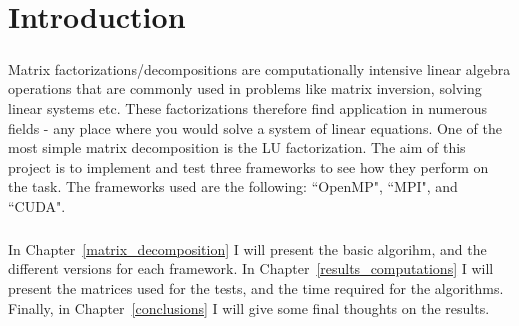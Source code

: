 \chapter{Introduction}
\paragraph{}
Matrix factorizations/decompositions are computationally intensive linear algebra operations that are commonly used in problems like matrix inversion, solving linear systems etc. These factorizations therefore find application in numerous fields - any place where you would solve a system of linear equations. One of the most simple matrix decomposition is the LU factorization. The aim of this project is to implement and test three frameworks to see how they perform on the task. The frameworks used are the following: ``OpenMP", ``MPI", and ``CUDA".

\paragraph{}
In Chapter~\ref{matrix_decomposition} I will present the basic algorihm, and the different versions for each framework. In Chapter~\ref{results_computations} I will present the matrices used for the tests, and the time required for the algorithms. Finally, in Chapter~\ref{conclusions} I will give some final thoughts on the results.